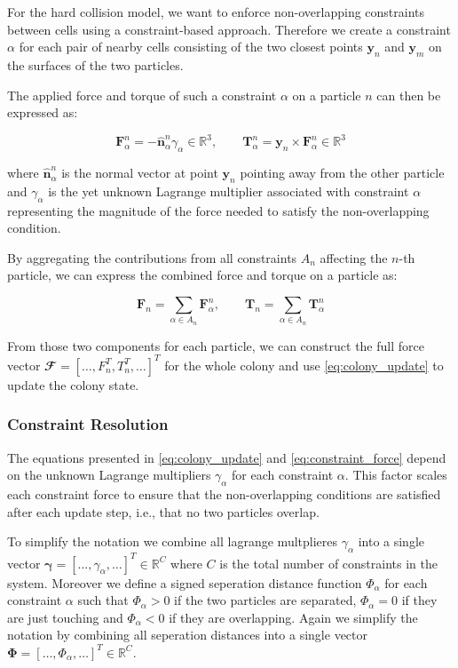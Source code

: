 \documentclass[conference]{IEEEtran}
\begin{document}
For the hard collision model, we want to enforce non-overlapping constraints between cells using a constraint-based approach. Therefore we create a constraint $\alpha$ for each pair of nearby cells consisting of the two closest points $\mathbf{y}_n$ and $\mathbf{y}_m$ on the surfaces of the two particles.

The applied force and torque of such a constraint $\alpha$ on a particle $n$ can then be expressed as:

$$
    \mathbf{F}_\alpha^n = - \hat{\mathbf{n}}_\alpha ^n \gamma_\alpha \in \mathbb{R}^3, \qquad \mathbf{T}_\alpha^n = \mathbf{y}_n \times \mathbf{F}_\alpha^n \in \mathbb{R}^3
$$
\label{eq:constraint_force}

where $\hat{\mathbf{n}}_\alpha ^n$ is the normal vector at point $\mathbf{y}_n$ pointing away from the other particle and $\gamma_\alpha$ is the yet unknown Lagrange multiplier associated with constraint $\alpha$ representing the magnitude of the force needed to satisfy the non-overlapping condition.

By aggregating the contributions from all constraints $A_n$ affecting the $n$-th particle, we can express the combined force and torque on a particle as:

$$
    \mathbf{F}_n = \sum_{\alpha \in A_n} \mathbf{F}_\alpha^n, \qquad \mathbf{T}_n = \sum_{\alpha \in A_n} \mathbf{T}_\alpha^n
$$
\label{eq:total_force}

From those two components for each particle, we can construct the full force vector $\mathbfcal{F} = [ \dots, F_n^T, T_n^T, \dots]^T$ for the whole colony and use \autoref{eq:colony_update} to update the colony state.


\subsubsection{Constraint Resolution}

The equations presented in \autoref{eq:colony_update} and \autoref{eq:constraint_force} depend on the unknown Lagrange multipliers $\gamma_\alpha$ for each constraint $\alpha$. This factor scales each constraint force to ensure that the non-overlapping conditions are satisfied after each update step, i.e., that no two particles overlap.

To simplify the notation we combine all lagrange multplieres $\gamma_\alpha$ into a single vector $\mathbf{\gamma} = [\dots, \gamma_\alpha, \dots]^T \in \mathbb{R}^{C}$ where $C$ is the total number of constraints in the system. Moreover we define a signed seperation distance function $\Phi_{\alpha}$ for each constraint $\alpha$ such that $\Phi_{\alpha} > 0$ if the two particles are separated, $\Phi_{\alpha} = 0$ if they are just touching and $\Phi_{\alpha} < 0$ if they are overlapping. Again we simplify the notation by combining all seperation distances into a single vector $\mathbf{\Phi} = [\dots, \Phi_\alpha, \dots]^T \in \mathbb{R}^{C}$.
\end{document}
